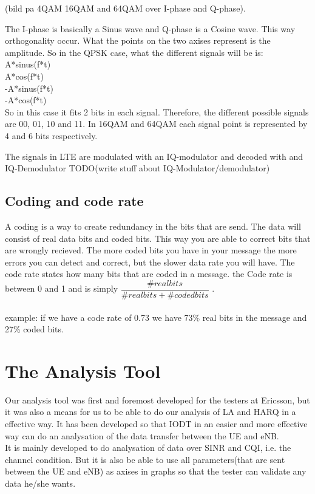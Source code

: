 \documentclass[cropmarks, frame, english]{idamasterthesis}
\begin{document}
(bild pa 4QAM 16QAM and 64QAM over I-phase and Q-phase). 
 
The I-phase is basically a Sinus wave and Q-phase is a Cosine wave. This way orthogonality occur. What the points on the two axises represent is the amplitude. So in the QPSK case, what the different signals will be is:\\
 A*sinus(f*t)\\
 A*cos(f*t)\\
 -A*sinus(f*t) \\  
 -A*cos(f*t)\\
 
 So in this case it fits 2 bits in each signal. Therefore, the different possible signals are 00, 01, 10 and 11. In 16QAM and 64QAM each signal point is represented by 4 and 6 bits respectively.

The signals in LTE are modulated with an IQ-modulator and decoded with and IQ-Demodulator 
TODO(write stuff about IQ-Modulator/demodulator)

\section{Coding and code rate}
A coding is a way to create redundancy in the bits that are send. The data will consist of real data bits and coded bits. This way you are able to correct bits that are wrongly recieved. The more coded bits you have in your message the more errors you can detect and correct, but the slower data rate you will have. The code rate states how many bits that are coded in a message. the Code rate is between 0 and 1 and is simply $\dfrac{\# real bits}{ \# real bits + \# coded bits}$ . 
\\ \\
example: if we have a code rate of 0.73 we have 73\% real bits in the message and 27\% coded bits. 


\chapter{The Analysis Tool}
Our analysis tool was first and foremost developed for the testers at Ericsson, but it was also a means for us to be able to do our analysis of LA and HARQ in a effective way. It has been developed so that IODT in an easier and more effective way can do an analysation of the data transfer between the UE and eNB. \\
It is mainly developed to do analysation of data over SINR and CQI, i.e. the channel condition. But it is also be able to use all parameters(that are sent between the UE and eNB) as axises in graphs so that the tester can validate any data he/she wants.
 
\end{document}
